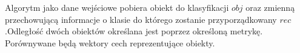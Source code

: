 \documentclass{classrep}
\begin{document}
\indent Algorytm jako dane wejściowe pobiera obiekt do klasyfikacji $obj$ oraz zmienną przechowującą informacje o klasie do którego zostanie przyporządkowany $rec$.Odległość dwóch obiektów określana jest poprzez określoną metrykę. Porównywane będą wektory cech reprezentujące obiekty.
\end{document}
